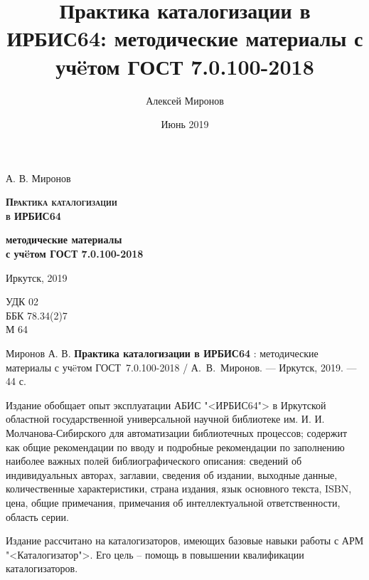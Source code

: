 \documentclass[a5paper,openany,10pt]{book}
\begin{document}
	
\frontmatter
\author{Алексей Миронов}
\title{Практика каталогизации в ИРБИС64: методические материалы с уч\"eтом ГОСТ 7.0.100-2018}
\date{Июнь 2019}

\begin{titlepage}
\clearpage\vspace*{\fill}
\begin{center}
	{\Large А. В. Миронов}
	
	\vspace{55mm}
	
	{\sffamily
		{\Huge\textbf{\textsc{Практика каталогизации\\в ИРБИС64}}}
	
		\vspace{5mm}
	
		{\large \textbf{методические материалы \\с уч\"eтом ГОСТ 7.0.100-2018}}
    }

	\vspace{65mm}
	
	{\large Иркутск, 2019}
\end{center}
\vspace*{\fill}
\end{titlepage}

\clearpage
\thispagestyle{empty}
\noindent УДК 02 \\
ББК 78.34(2)7 \\
М 64

\vspace{8mm}

Миронов А. В. \textbf{Практика каталогизации в ИРБИС64} : методические материалы с уч\"eтом ГОСТ~7.0.100-2018 / А.~В.~Миронов. — Иркутск, 2019. — 44 с.


\vspace{8mm}

Издание обобщает опыт эксплуатации АБИС "<ИРБИС64"> в Иркутской областной государственной универсальной научной библиотеке им. И. И. Мол\-ча\-но\-ва-Сибирского для автоматизации библиотечных процессов; содержит как общие рекомендации по вводу и подробные рекомендации по заполнению наиболее важных полей библиографического описания: сведений об индивидуальных авторах, заглавии, сведения об издании, выходные данные, количественные характеристики, страна издания, язык основного текста, ISBN, цена, общие примечания, примечания об интеллектуальной ответственности, область серии.

\vspace{3mm}
Издание рассчитано на каталогизаторов, имеющих базовые навыки работы с АРМ "<Каталогизатор">. Его цель – помощь в повышении квалификации каталогизаторов.
\end{document}
